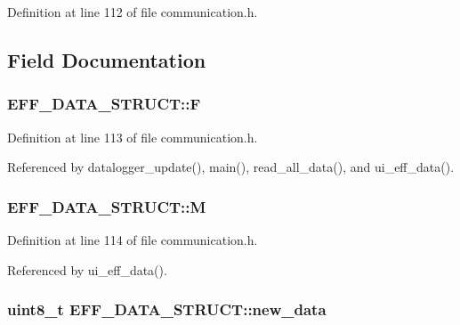 Definition at line 112 of file communication.\-h.



\subsection{Field Documentation}
\hypertarget{structEFF__DATA__STRUCT_abe8952947b54bf9c247f3429ee3aeb44}{
\subsubsection[{F}]{ E\-F\-F\-\_\-\-D\-A\-T\-A\-\_\-\-S\-T\-R\-U\-C\-T\-::\-F}}\label{structEFF__DATA__STRUCT_abe8952947b54bf9c247f3429ee3aeb44}


Definition at line 113 of file communication.\-h.



Referenced by datalogger\-\_\-update(), main(), read\-\_\-all\-\_\-data(), and ui\-\_\-eff\-\_\-data().

\hypertarget{structEFF__DATA__STRUCT_aaf6e03b6e600295e0f5c706fc869e9d1}{
\subsubsection[{M}]{ E\-F\-F\-\_\-\-D\-A\-T\-A\-\_\-\-S\-T\-R\-U\-C\-T\-::\-M}}\label{structEFF__DATA__STRUCT_aaf6e03b6e600295e0f5c706fc869e9d1}


Definition at line 114 of file communication.\-h.



Referenced by ui\-\_\-eff\-\_\-data().

\hypertarget{structEFF__DATA__STRUCT_aa42ebc512dd79fa6ebf998162a149446}{
\subsubsection[{new\-\_\-data}]{\setlength{\rightskip}{0pt plus 5cm}uint8\-\_\-t E\-F\-F\-\_\-\-D\-A\-T\-A\-\_\-\-S\-T\-R\-U\-C\-T\-::new\-\_\-data}}\label{structEFF__DATA__STRUCT_aa42ebc512dd79fa6ebf998162a149446}


